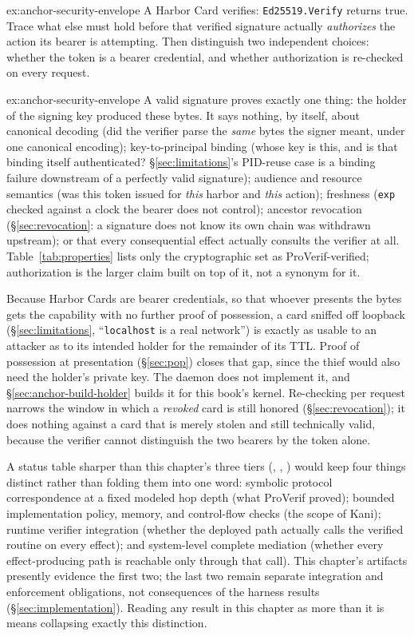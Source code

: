 \documentclass[11pt,a4paper]{article}
\theoremstyle{definition}
\begin{document}
\begin{pdexercise}[kind=Trace,rating=2]{ex:anchor-security-envelope}
A Harbor Card verifies: \texttt{Ed25519.Verify} returns true. Trace what else must hold before that verified signature actually \emph{authorizes} the action its bearer is attempting. Then distinguish two independent choices: whether the token is a bearer credential, and whether authorization is re-checked on every request.
\end{pdexercise}
\begin{pdsolution}{ex:anchor-security-envelope}
A valid signature proves exactly one thing: the holder of the signing key produced these bytes. It says nothing, by itself, about canonical decoding (did the verifier parse the \emph{same} bytes the signer meant, under one canonical encoding); key-to-principal binding (whose key is this, and is that binding itself authenticated? \S\ref{sec:limitations}'s PID-reuse case is a binding failure downstream of a perfectly valid signature); audience and resource semantics (was this token issued for \emph{this} harbor and \emph{this} action); freshness (\texttt{exp} checked against a clock the bearer does not control); ancestor revocation (\S\ref{sec:revocation}: a signature does not know its own chain was withdrawn upstream); or that every consequential effect actually consults the verifier at all. Table~\ref{tab:properties} lists only the cryptographic set as ProVerif-verified; authorization is the larger claim built on top of it, not a synonym for it.

Because Harbor Cards are bearer credentials, so that whoever presents the bytes gets the capability with no further proof of possession, a card sniffed off loopback (\S\ref{sec:limitations}, ``\texttt{localhost} is a real network'') is exactly as usable to an attacker as to its intended holder for the remainder of its TTL. Proof of possession at presentation (\S\ref{sec:pop}) closes that gap, since the thief would also need the holder's private key. The daemon does not implement it, and \S\ref{sec:anchor-build-holder} builds it for this book's kernel. Re-checking per request narrows the window in which a \emph{revoked} card is still honored (\S\ref{sec:revocation}); it does nothing against a card that is merely stolen and still technically valid, because the verifier cannot distinguish the two bearers by the token alone.

A status table sharper than this chapter's three tiers (\Closed, \Partial, \Open) would keep four things distinct rather than folding them into one word: symbolic protocol correspondence at a fixed modeled hop depth (what ProVerif proved); bounded implementation policy, memory, and control-flow checks (the scope of Kani); runtime verifier integration (whether the deployed path actually calls the verified routine on every effect); and system-level complete mediation (whether every effect-producing path is reachable only through that call). This chapter's artifacts presently evidence the first two; the last two remain separate integration and enforcement obligations, not consequences of the harness results (\S\ref{sec:implementation}). Reading any result in this chapter as more than it is means collapsing exactly this distinction.
\end{pdsolution}
\end{document}
